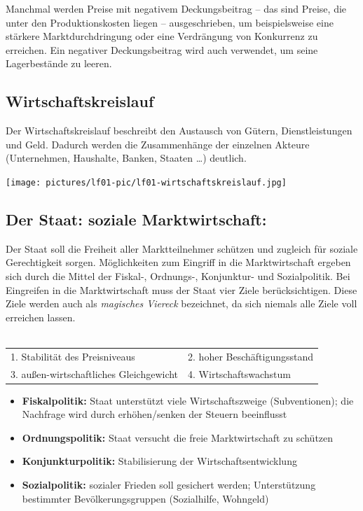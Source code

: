 Manchmal werden Preise mit negativem Deckungsbeitrag -- das sind Preise, die unter den Produktionskosten liegen -- ausgeschrieben, um beispielsweise eine stärkere Marktdurchdringung oder eine Verdrängung von Konkurrenz zu erreichen. Ein negativer Deckungsbeitrag wird auch verwendet, um seine Lagerbestände zu leeren.


\subsection{Wirtschaftskreislauf}

Der Wirtschaftskreislauf beschreibt den Austausch von Gütern, Dienstleistungen und Geld. Dadurch werden die Zusammenhänge der einzelnen Akteure (Unternehmen, Haushalte, Banken, Staaten \dots) deutlich. 

\texttt{[image: pictures/lf01-pic/lf01-wirtschaftskreislauf.jpg]}


\subsection{Der Staat: soziale Marktwirtschaft:}

Der Staat soll die Freiheit aller Marktteilnehmer schützen und zugleich für soziale Gerechtigkeit sorgen. Möglichkeiten zum Eingriff in die Marktwirtschaft ergeben sich durch die Mittel der Fiskal-, Ordnungs-, Konjunktur- und Sozialpolitik. Bei Eingreifen in die Marktwirtschaft muss der Staat vier Ziele berücksichtigen. Diese Ziele werden auch als {\it magisches Viereck} bezeichnet, da sich niemals alle Ziele voll erreichen lassen.\\\\
\begin{tabular}{ll}
1. Stabilität des Preisniveaus & 2. hoher Beschäftigungsstand\\
3. außen-wirtschaftliches Gleichgewicht & 4. Wirtschaftswachstum\\
\end{tabular}

\begin{itemize}
\setlength\itemsep{0em}
	\item {\bf Fiskalpolitik:} Staat unterstützt viele Wirtschaftszweige (Subventionen); die Nachfrage wird durch erhöhen/senken der Steuern beeinflusst
	\item {\bf Ordnungspolitik:} Staat versucht die freie Marktwirtschaft zu schützen
	\item {\bf Konjunkturpolitik:} Stabilisierung der Wirtschaftsentwicklung
	\item {\bf Sozialpolitik:} sozialer Frieden soll gesichert werden; Unterstützung bestimmter Bevölkerungsgruppen (Sozialhilfe, Wohngeld)
\end{itemize}
	
